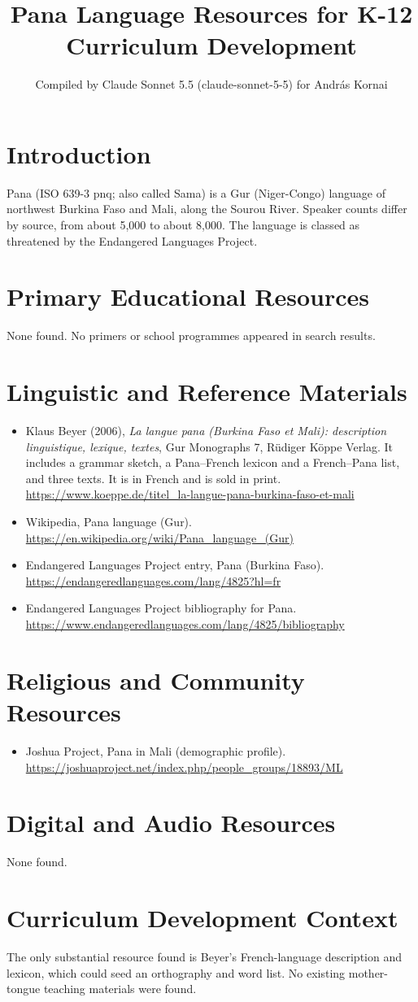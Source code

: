 \documentclass[12pt]{article}
\title{Pana Language Resources for K-12 Curriculum Development}
\author{Compiled by Claude Sonnet 5.5 (claude-sonnet-5-5) for Andr\'as Kornai}
\date{}
\begin{document}
\maketitle
\section{Introduction}
Pana (ISO 639-3 pnq; also called Sama) is a Gur (Niger-Congo) language of northwest Burkina Faso and Mali, along the Sourou River. Speaker counts differ by source, from about 5,000 to about 8,000. The language is classed as threatened by the Endangered Languages Project.
\section{Primary Educational Resources}
None found. No primers or school programmes appeared in search results.
\section{Linguistic and Reference Materials}
\begin{itemize}
\item Klaus Beyer (2006), \emph{La langue pana (Burkina Faso et Mali): description linguistique, lexique, textes}, Gur Monographs 7, R\"udiger K\"oppe Verlag. It includes a grammar sketch, a Pana--French lexicon and a French--Pana list, and three texts. It is in French and is sold in print. \url{https://www.koeppe.de/titel_la-langue-pana-burkina-faso-et-mali}
\item Wikipedia, Pana language (Gur). \url{https://en.wikipedia.org/wiki/Pana_language_(Gur)}
\item Endangered Languages Project entry, Pana (Burkina Faso). \url{https://endangeredlanguages.com/lang/4825?hl=fr}
\item Endangered Languages Project bibliography for Pana. \url{https://www.endangeredlanguages.com/lang/4825/bibliography}
\end{itemize}
\section{Religious and Community Resources}
\begin{itemize}
\item Joshua Project, Pana in Mali (demographic profile). \url{https://joshuaproject.net/index.php/people_groups/18893/ML}
\end{itemize}
\section{Digital and Audio Resources}
None found.
\section{Curriculum Development Context}
The only substantial resource found is Beyer's French-language description and lexicon, which could seed an orthography and word list. No existing mother-tongue teaching materials were found.
\end{document}
